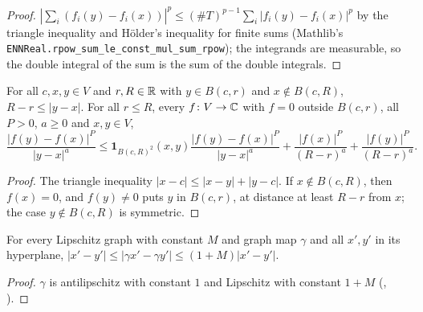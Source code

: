 \begin{proof}
\leanok
$|\sum_i (f_i(y) - f_i(x))|^p \leq (\# T)^{p-1} \sum_i |f_i(y) - f_i(x)|^p$ by the triangle
inequality and Hölder's inequality for finite sums (Mathlib's
\texttt{ENNReal.\allowbreak rpow\_sum\_le\_const\_mul\_sum\_rpow}); the integrands are measurable,
so the double integral of the sum is the sum of the double integrals.
\end{proof}

\begin{lemma}
\label{lem:slobodeckij-integrand-support}
\leanok
For all $c, x, y \in V$ and $r, R \in \mathbb{R}$ with $y \in B(c, r)$ and $x \notin B(c, R)$,
$R - r \leq |y - x|$. For all $r \leq R$, every $f \colon V \to \mathbb{C}$ with $f = 0$ outside
$B(c, r)$, all $P > 0$, $a \geq 0$ and $x, y \in V$,
\[
  \frac{|f(y) - f(x)|^P}{|y - x|^a} \leq \mathbf 1_{B(c, R)^2}(x, y)
    \frac{|f(y) - f(x)|^P}{|y - x|^a} + \frac{|f(x)|^P}{(R - r)^a}
    + \frac{|f(y)|^P}{(R - r)^a} .
\]
\end{lemma}

\begin{proof}
\leanok
The triangle inequality $|x - c| \leq |x - y| + |y - c|$. If $x \notin B(c, R)$, then $f(x) = 0$,
and $f(y) \neq 0$ puts $y$ in $B(c, r)$, at distance at least $R - r$ from $x$; the case
$y \notin B(c, R)$ is symmetric.
\end{proof}

\begin{lemma}
\label{lem:graph-map-bilipschitz}
\leanok
{}
For every Lipschitz graph with constant $M$ and graph map $\gamma$ and all $x', y'$ in its
hyperplane, $|x' - y'| \leq |\gamma x' - \gamma y'| \leq (1 + M) |x' - y'|$.
\end{lemma}

\begin{proof}
\leanok
$\gamma$ is antilipschitz with constant $1$ and Lipschitz with constant $1 + M$
(, ).
\end{proof}

